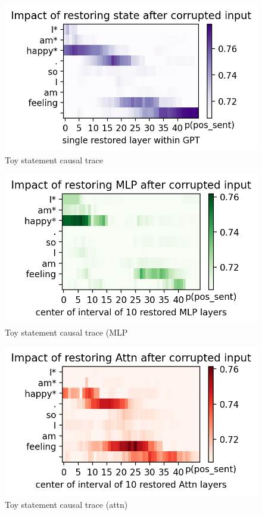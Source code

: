 \documentclass[10pt,a4paper]{report}
\begin{document}
\begin{figure}[h]

\centering
\includegraphics{toy_statement_trace1.png}
\caption{Toy statement causal trace}

\end{figure}

\begin{figure}[h]

\centering
\includegraphics{toy_statement_trace2}
\caption{Toy statement causal trace (MLP}

\end{figure}


\begin{figure}[h]

\centering
\includegraphics{toy_statement_trace3}
\caption{Toy statement causal trace (attn)}

\end{figure}
\end{document}
